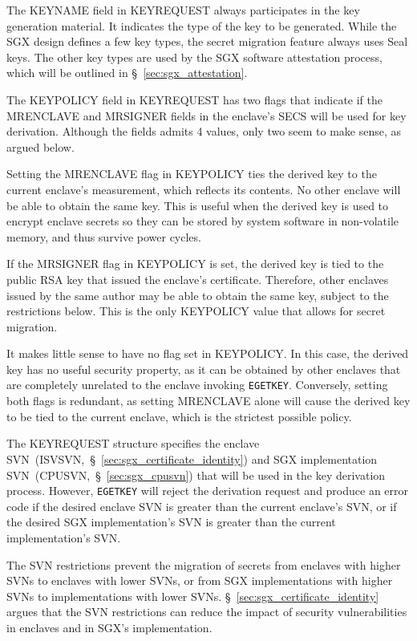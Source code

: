 The KEYNAME field in KEYREQUEST always participates in the key generation
material. It indicates the type of the key to be generated. While the SGX
design defines a few key types, the secret migration feature always uses Seal
keys. The other key types are used by the SGX software attestation process,
which will be outlined in \S~\ref{sec:sgx_attestation}.

The KEYPOLICY field in KEYREQUEST has two flags that indicate if the MRENCLAVE
and MRSIGNER fields in the enclave's SECS will be used for key derivation.
Although the fields admits 4 values, only two seem to make sense, as argued
below.

Setting the MRENCLAVE flag in KEYPOLICY ties the derived key to the current
enclave's measurement, which reflects its contents. No other enclave will be
able to obtain the same key. This is useful when the derived key is used to
encrypt enclave secrets so they can be stored by system software in
non-volatile memory, and thus survive power cycles.

If the MRSIGNER flag in KEYPOLICY is set, the derived key is tied to the public
RSA key that issued the enclave's certificate. Therefore, other enclaves issued
by the same author may be able to obtain the same key, subject to the
restrictions below. This is the only KEYPOLICY value that allows for secret
migration.

It makes little sense to have no flag set in KEYPOLICY. In this case, the
derived key has no useful security property, as it can be obtained by other
enclaves that are completely unrelated to the enclave invoking
\texttt{EGETKEY}. Conversely, setting both flags is redundant, as setting
MRENCLAVE alone will cause the derived key to be tied to the current enclave,
which is the strictest possible policy.

The KEYREQUEST structure specifies the enclave
SVN~(ISVSVN,~\S~\ref{sec:sgx_certificate_identity}) and SGX implementation
SVN~(CPUSVN,~\S~\ref{sec:sgx_cpusvn}) that will be used in the key derivation
process. However, \texttt{EGETKEY} will reject the derivation request and
produce an error code if the desired enclave SVN is greater than the current
enclave's SVN, or if the desired SGX implementation's SVN is greater than the
current implementation's SVN.

The SVN restrictions prevent the migration of secrets from enclaves with higher
SVNs to enclaves with lower SVNs, or from SGX implementations with higher SVNs
to implementations with lower SVNs. \S~\ref{sec:sgx_certificate_identity}
argues that the SVN restrictions can reduce the impact of security
vulnerabilities in enclaves and in SGX's implementation.


